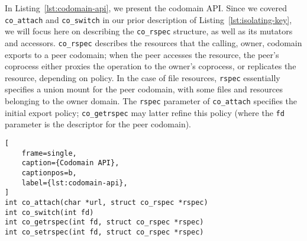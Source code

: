%
In Listing~\ref{lst:codomain-api}, we present the codomain API\@.
%
Since we covered \texttt{co\_attach} and \texttt{co\_switch} in our prior
description of Listing~\ref{lst:isolating-key}, we will focus here on describing
the \texttt{co\_rspec} structure, as well as its mutators and accessors.
%
\texttt{co\_rspec} describes the resources that the calling, owner, codomain
exports to a peer codomain; when the peer accesses the resource, the peer's
coprocess either proxies the operation to the owner's coprocess, or replicates
the resource, depending on policy.
%
In the case of file resources, \texttt{rspec} essentially specifies a union
mount for the peer codomain, with some files and resources belonging to the
owner domain.
%
The \texttt{rspec} parameter of \texttt{co\_attach} specifies the initial
export policy; \texttt{co\_getrspec} may latter refine this policy (where
the \texttt{fd} parameter is the descriptor for the peer codomain).

\begin{lstlisting}[
    frame=single,
    caption={Codomain API},
    captionpos=b,
    label={lst:codomain-api},
]
int co_attach(char *url, struct co_rspec *rspec)
int co_switch(int fd)
int co_getrspec(int fd, struct co_rspec *rspec)
int co_setrspec(int fd, struct co_rspec *rspec)
\end{lstlisting}

%

